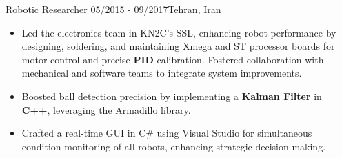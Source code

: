 \resumeSubheadingReza
{Robotic Researcher}{}
{05/2015 - 09/2017}{Tehran, Iran}
{
    \vspace{-12pt}
    \begin{itemize}
        \item{Led the electronics team in KN2C's SSL, enhancing robot performance by designing, soldering, and maintaining Xmega and ST processor boards for motor control and precise \textbf{PID} calibration. Fostered collaboration with mechanical and software teams to integrate system improvements.}
        \item{Boosted ball detection precision by implementing a \textbf{Kalman Filter} in \textbf{C++}, leveraging the Armadillo library.}
        \item{Crafted a real-time GUI in C\# using Visual Studio for simultaneous condition monitoring of all robots, enhancing strategic decision-making.}
    \end{itemize}
}


